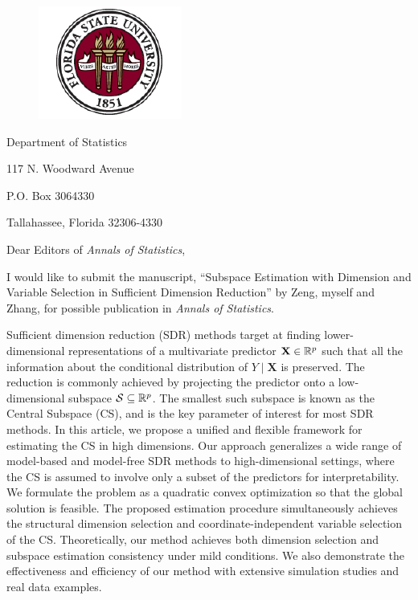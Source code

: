 \documentclass[12pt]{article}
\title{}
\date{}
\begin{document}
\pagestyle{empty}

\begin{figure}
    \centering
    \includegraphics[scale=1.3]{fsulogo.pdf}
\end{figure}

{
    Department of Statistics

    117 N. Woodward Avenue

    P.O. Box 3064330

    Tallahassee, Florida 32306-4330\par
}

\vspace{2em}

Dear Editors of \textsl{Annals of Statistics},

I would like to submit the manuscript, ``Subspace Estimation with Dimension and Variable Selection in Sufficient Dimension Reduction'' by Zeng, myself and Zhang, for possible publication in \textsl{Annals of Statistics}. 

Sufficient dimension reduction (SDR) methods target at finding lower-dimensional representations of a multivariate predictor $\mathbf{X}\in\mathbb{R}^p$ such that all the information about the conditional distribution of $Y\mid \mathbf{X}$ is preserved. The reduction is commonly achieved by projecting the predictor onto a low-dimensional subspace  $\mathcal{S}\subseteq\mathbb{R}^p$. The smallest such subspace is known as the Central Subspace (CS), and is the key parameter of interest for most SDR methods. In this article, we propose a unified and flexible framework for estimating the CS in high dimensions. Our approach generalizes a wide range of model-based and model-free SDR methods to high-dimensional settings, where the CS is assumed to involve only a subset of the predictors for interpretability. We formulate the problem as a quadratic convex optimization so that the global solution is feasible. The proposed estimation procedure simultaneously achieves the structural dimension selection and coordinate-independent variable selection of the CS.  Theoretically, our method achieves {both dimension selection and subspace estimation consistency} under mild conditions. We also demonstrate the effectiveness and efficiency of our method with extensive simulation studies and real data examples.
\end{document}
